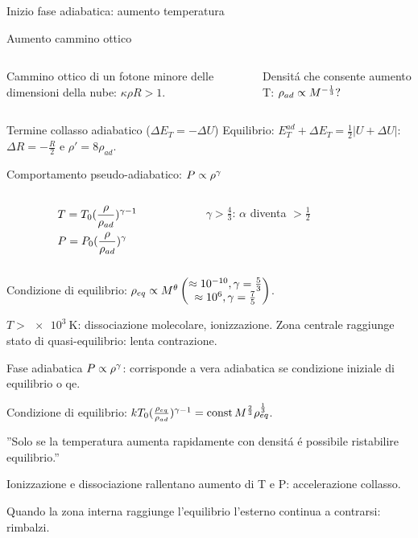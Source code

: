 \begin{frame}{Inizio fase adiabatica: aumento temperatura}
\begin{block}{Aumento cammino ottico}
\begin{columns}[T]
\begin{column}{0.5\textwidth}
Cammino ottico di un fotone minore delle dimensioni della nube: $\kappa\rho R>1$.
\end{column}
\begin{column}{0.5\textwidth}
Densit\'a che consente aumento T: $\rho_{ad}\propto M^{-\frac{1}{3}}?$
\end{column}
\end{columns}
\end{block}
\begin{block}{Termine collasso adiabatico ($\Delta E_T=-\Delta U$)}
Equilibrio: $E_T^{ad}+\Delta E_T=\frac{1}{2}|U+\Delta U|$: $\Delta R=-\frac{R}{2}$ e $\rho'=8\rho_{ad}$.
\end{block}
\begin{block}{Comportamento pseudo-adiabatico: $P\propto\rho^{\gamma}$}
\begin{columns}[T]
\begin{column}{0.5\textwidth}
\begin{align*}
&T=T_0(\frac{\rho}{\rho_{ad}})^{\gamma-1}\\
&P=P_0(\frac{\rho}{\rho_{ad}})^{\gamma}
\end{align*}
\end{column}
\begin{column}{0.5\textwidth}
$\gamma>\frac{4}{3}$: $\alpha$ diventa $>\frac{1}{2}$
\end{column}
\end{columns}
Condizione di equilibrio: $\rho_{eq}\propto M^{\theta}\begin{pmatrix}
\approx\num{e-10}, \gamma=\frac{5}{3}\\
\approx\num{e6}, \gamma=\frac{7}{5}
\end{pmatrix}$.
\end{block}
$T>\SI{e3}{\kelvin}$: dissociazione molecolare, ionizzazione.
Zona centrale raggiunge stato di quasi-equilibrio: lenta contrazione.
\end{frame}

\begin{wordonframe}{Fase adiabatica}
$P\propto\rho^{\gamma}$: corrisponde a vera adiabatica  se condizione iniziale di equilibrio o qe.

Condizione di equilibrio: $kT_0(\frac{\rho_{eq}}{\rho_{ad}})^{\gamma-1}=\operatorname{const} M^{\frac{2}{3}}\rho_{eq}^{\frac{1}{3}}$.

''Solo se la temperatura aumenta rapidamente con densit\'a \'e possibile ristabilire equilibrio.''

Ionizzazione e dissociazione rallentano aumento di T e P: accelerazione collasso.

Quando la zona interna raggiunge l'equilibrio l'esterno continua a contrarsi: rimbalzi.

\end{wordonframe}


